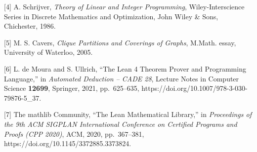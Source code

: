 \documentclass[
  spanish,
  11pt,
  a4paper,
]{article}
\begin{document}
{[}4{]} A. Schrijver, \emph{Theory of Linear and Integer Programming}, Wiley-Interscience Series in Discrete Mathematics and Optimization, John Wiley \& Sons, Chichester, 1986.

{[}5{]} M. S. Cavers, \emph{Clique Partitions and Coverings of Graphs}, M.Math. essay, University of Waterloo, 2005.

{[}6{]} L. de Moura and S. Ullrich, ``The Lean 4 Theorem Prover and Programming Language,'' in \emph{Automated Deduction -- CADE 28}, Lecture Notes in Computer Science \textbf{12699}, Springer, 2021, pp.~625--635, https://doi.org/10.1007/978-3-030-79876-5\_37.

{[}7{]} The mathlib Community, ``The Lean Mathematical Library,'' in \emph{Proceedings of the 9th ACM SIGPLAN International Conference on Certified Programs and Proofs (CPP 2020)}, ACM, 2020, pp.~367--381, https://doi.org/10.1145/3372885.3373824.
\end{document}
